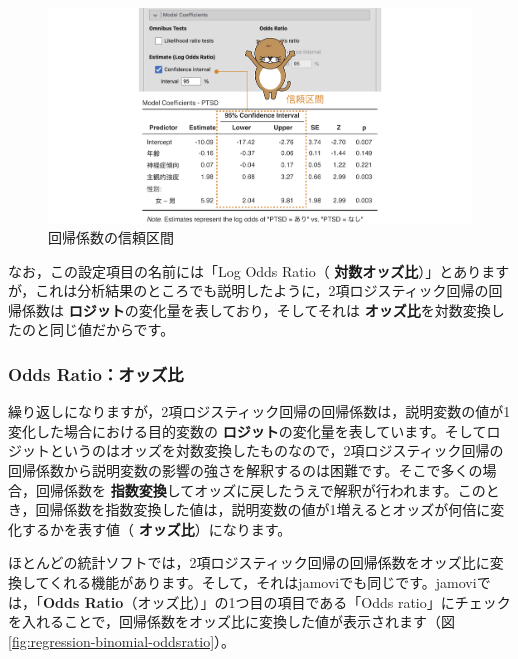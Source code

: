 \documentclass[
  12pt,
  a5jpaper,
  lualatex, ja=standard]{bxjsbook}
\renewcommand{\emph}[1]{\textbf{\color{emph} #1}}
\begin{document}
\begin{figure}[!ht]

{\centering \includegraphics[width=1\linewidth]{images/regression/binomial-ci} 

}

\caption{回帰係数の信頼区間}\label{fig:regression-binomial-ci}
\end{figure}

なお，この設定項目の名前には「Log Odds Ratio（\emph{対数オッズ比}）」とありますが，これは分析結果のところでも説明したように，2項ロジスティック回帰の回帰係数は\emph{ロジット}の変化量を表しており，そしてそれは\emph{オッズ比}を対数変換したのと同じ値だからです。

\hypertarget{odds-ratioux30aaux30c3ux30baux6bd4}{%
\subsubsection*{Odds Ratio：オッズ比}\label{odds-ratioux30aaux30c3ux30baux6bd4}}

繰り返しになりますが，2項ロジスティック回帰の回帰係数は，説明変数の値が1変化した場合における目的変数の\emph{ロジット}の変化量を表しています。そしてロジットというのはオッズを対数変換したものなので，2項ロジスティック回帰の回帰係数から説明変数の影響の強さを解釈するのは困難です。そこで多くの場合，回帰係数を\emph{指数変換}してオッズに戻したうえで解釈が行われます。このとき，回帰係数を指数変換した値は，説明変数の値が1増えるとオッズが何倍に変化するかを表す値（\emph{オッズ比}）になります。

ほとんどの統計ソフトでは，2項ロジスティック回帰の回帰係数をオッズ比に変換してくれる機能があります。そして，それはjamoviでも同じです。jamoviでは，「\textbf{Odds Ratio}（オッズ比）」の1つ目の項目である「Odds ratio」にチェックを入れることで，回帰係数をオッズ比に変換した値が表示されます（図\ref{fig:regression-binomial-oddsratio}）。
\end{document}
